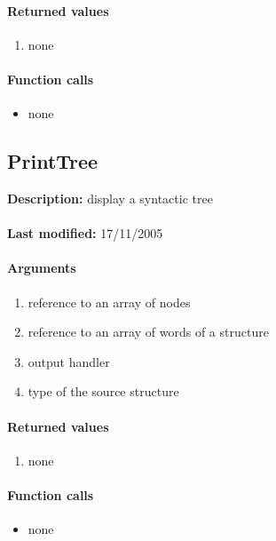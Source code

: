 \paragraph{Returned values}
\begin{enumerate}
\item none
\end{enumerate}

\paragraph{Function calls}
\begin{itemize}
\item none
\end{itemize}

\subsection{PrintTree}
\textbf{Description:} display a syntactic tree\\
\\\textbf{Last modified:} 17/11/2005

\paragraph{Arguments}
\begin{enumerate}
\item reference to an array of nodes
\item reference to an array of words of a structure
\item output handler
\item type of the source structure
\end{enumerate}

\paragraph{Returned values}
\begin{enumerate}
\item none
\end{enumerate}

\paragraph{Function calls}
\begin{itemize}
\item none
\end{itemize}

